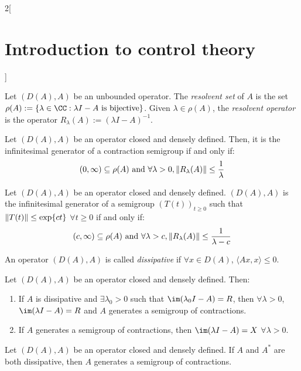 \documentclass[../../../main_math.tex]{subfiles}
\begin{document}
\begin{multicols}{2}[\section{Introduction to control theory}]
\begin{definition}
    Let $(D(A),A)$ be an unbounded operator. The \emph{resolvent set} of $A$ is the set $\rho(A):=\{ \lambda\in \CC:\lambda I-A\text{ is bijective}\}$. Given $\lambda\in\rho(A)$, the \emph{resolvent operator} is the operator $R_\lambda(A):=(\lambda I-A)^{-1}$.
  \end{definition}
  \begin{theorem}
    Let $(D(A),A)$ be an operator closed and densely defined. Then, it is the infinitesimal generator of a contraction semigroup if and only if:
    $$
      (0,\infty)\subseteq \rho(A)\text{ and }\forall \lambda>0, \norm{R_\lambda(A)}\leq \frac{1}{\lambda}
    $$
  \end{theorem}
  \begin{corollary}
    Let $(D(A),A)$ be an operator closed and densely defined. $(D(A),A)$ is the infinitesimal generator of a semigroup $(T(t))_{t\geq 0}$ such that $\norm{T(t)}\leq \exp{ct}$ $\forall t\geq 0$ if and only if:
    $$
      (c,\infty)\subseteq \rho(A)\text{ and }\forall \lambda>c, \norm{R_\lambda(A)}\leq \frac{1}{\lambda-c}
    $$
  \end{corollary}
  \begin{definition}
    An operator $(D(A),A)$ is called \emph{dissipative} if $\forall x\in D(A)$, $\langle Ax,x\rangle\leq 0$.
  \end{definition}
  \begin{theorem}
    Let $(D(A),A)$ be an operator closed and densely defined. Then:
    \begin{enumerate}
      \item If $A$ is dissipative and $\exists \lambda_0>0$ such that $\im(\lambda_0 I-A)=R$, then $\forall \lambda>0$, $\im(\lambda I-A)=R$ and $A$ generates a semigroup of contractions.
      \item If $A$ generates a semigroup of contractions, then $\im(\lambda I-A)=X$ $\forall \lambda>0$.
    \end{enumerate}
  \end{theorem}
  \begin{corollary}
    Let $(D(A),A)$ be an operator closed and densely defined. If $A$ and $A^*$ are both dissipative, then $A$ generates a semigroup of contractions.
  \end{corollary}

\end{multicols}
\end{document}
